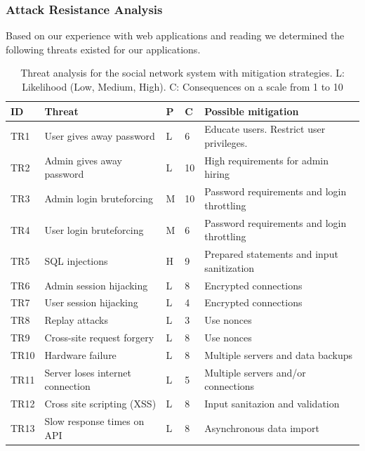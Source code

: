 \documentclass[a4paper]{article}
\begin{document}
\subsubsection{Attack Resistance Analysis}
Based on our experience with web applications and reading\cite{sins2009} we determined the following threats existed for our applications.

\begin{table}[h!]
	\begin{tabular}{| l | p{4cm} | l | l | p{5cm} |}
		\hline
		\textbf{ID} & \textbf{Threat} & \textbf{P} & \textbf{C} & \textbf{Possible mitigation} \\ \hline
		TR1 & User gives away password & L & 6 & Educate users. Restrict user privileges. \\ \hline
        TR2 & Admin gives away password & L  & 10 & High requirements for admin hiring \\ \hline
        TR3 & Admin login bruteforcing & M & 10 & Password requirements and login throttling \\ \hline
        TR4 & User login bruteforcing & M & 6 & Password requirements and login throttling \\ \hline
        TR5 & SQL injections & H & 9 & Prepared statements and input sanitization \\ \hline
        TR6 & Admin session hijacking & L & 8 & Encrypted connections \\ \hline
        TR7 & User session hijacking & L & 4 & Encrypted connections \\ \hline
        TR8 & Replay attacks & L & 3 & Use nonces \\ \hline
       	TR9 & Cross-site request forgery & L & 8 & Use nonces \\ \hline
        TR10 & Hardware failure & L & 8 & Multiple servers and data backups \\ \hline
        TR11 & Server loses internet connection & L & 5 & Multiple servers and/or connections \\ \hline
        TR12 & Cross site scripting (XSS) & L & 8 & Input sanitazion and validation \\ \hline
        TR13 & Slow response times on API & L & 8 & Asynchronous data import\\ \hline
	\end{tabular}
	\caption{Threat analysis for the social network system with mitigation strategies. L: Likelihood (Low, Medium, High). C: Consequences on a scale from 1 to 10}
		\label{tab:threats}
\end{table}
\end{document}
